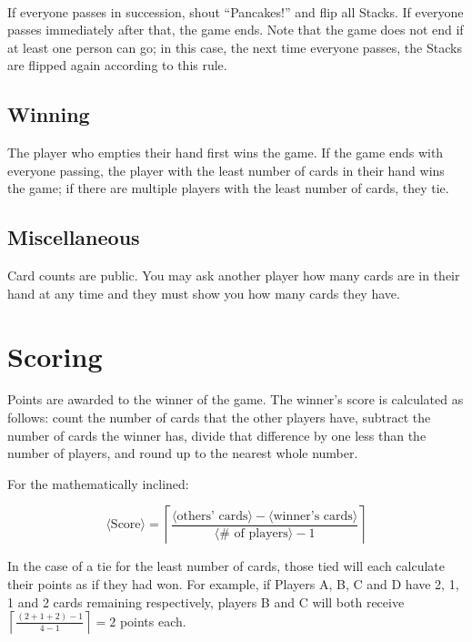 \documentclass{article}
\begin{document}
\paragraph{} \label{par:pancakeflip}
If everyone passes in succession, shout ``Pancakes!'' and flip all Stacks. If everyone passes immediately after that, the game ends. Note that the game does not end if at least one person can go; in this case, the next time everyone passes, the Stacks are flipped again according to this rule.

\subsection{Winning}
\label{sec:winning}

The player who empties their hand first wins the game. If the game ends with everyone passing, the player with the least number of cards in their hand wins the game; if there are multiple players with the least number of cards, they tie.

\subsection{Miscellaneous}
\label{sec:misc}

Card counts are public. You may ask another player how many cards are in their hand at any time and they must show you how many cards they have.

\pagebreak
\section{Scoring}
\label{sec:scoring}

Points are awarded to the winner of the game. The winner's score is calculated as follows: count the number of cards that the other players have, subtract the number of cards the winner has, divide that difference by one less than the number of players, and round up to the nearest whole number.

For the mathematically inclined:

$$
\langle\textrm{Score}\rangle = \left\lceil\frac{\langle\textrm{others'\ cards}\rangle - \langle\textrm{winner's\ cards}\rangle}{\langle\textrm{\#\ of\ players}\rangle - 1}\right\rceil
$$

In the case of a tie for the least number of cards, those tied will each calculate their points as if they had won. For example, if Players A, B, C and D have 2, 1, 1 and 2 cards remaining respectively, players B and C will both receive $\left\lceil\frac{(2+1+2) - 1}{4 - 1}\right\rceil = 2$ points each.
\end{document}
